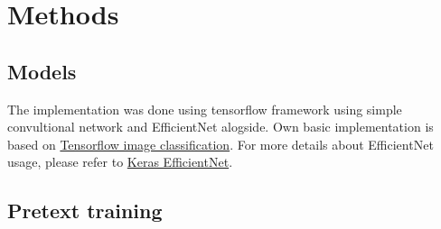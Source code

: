 \section{Methods}

\subsection{Models}
The implementation was done using tensorflow framework using simple convultional network and EfficientNet alogside. Own basic implementation is based on \href{https://www.tensorflow.org/tutorials/images/classification}{Tensorflow image classification}.
For more details about EfficientNet usage, please refer to \href{https://keras.io/api/applications/efficientnet/}{Keras EfficientNet}.

\subsection{Pretext training}

